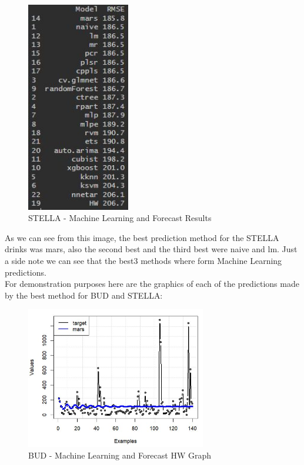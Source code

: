 \begin{figure}[H]
    \centering
    \includegraphics[width=0.4\textwidth]{assets/stella-split.jpeg}
    \caption{STELLA - Machine Learning and Forecast Results}
    \label{fig:split_stella}
    \end{figure}

As we can see from this image, the best prediction method for the STELLA drinks was mars, also the second best and the third best were naive and lm. Just a side note we can see that the best3 methods where form Machine Learning predictions.\\

For demonstration purposes here are the graphics of each of the predictions made by the best method for BUD and STELLA:

\begin{figure}[H]
    \centering
    \includegraphics[width=0.7\textwidth]{assets/bud-split-graph.jpeg}
    \caption{BUD - Machine Learning and Forecast HW Graph}
    \label{fig:mulivariate_dataset}
    \end{figure}

